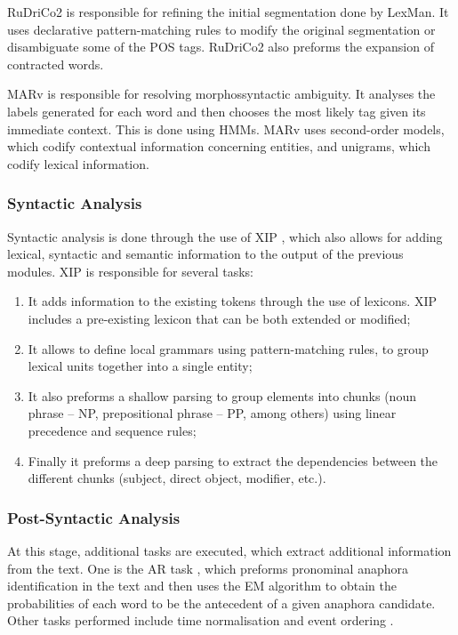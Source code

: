 \ac{RuDriCo2} is responsible for refining the initial segmentation done by
LexMan. It uses declarative pattern-matching rules to modify the original
segmentation or disambiguate some of the \ac{POS} tags. \ac{RuDriCo2} also
preforms the expansion of contracted words.

\ac{MARv} is responsible for resolving morphossyntactic ambiguity. It analyses
the labels generated for each word and then chooses the most likely tag given
its immediate context. This is done using \acp{HMM}. \ac{MARv} uses
second-order models, which codify contextual information concerning entities,
and unigrams, which codify lexical information.

\subsubsection*{Syntactic Analysis}

Syntactic analysis is done through the use of \acf{XIP} 
\citep{ait2002robustness},
which also allows for adding lexical, syntactic and semantic information to the
output of the previous modules. \ac{XIP} is responsible for several tasks:

\begin{enumerate}[label=(\roman*)]
 \item It adds information to the existing tokens through the use of lexicons.
\ac{XIP} includes a pre-existing lexicon that can be both extended or modified;
 \item It allows to define local grammars using pattern-matching rules, to group
lexical units together into a single entity;
 \item It also preforms a shallow parsing to group elements into chunks (noun
 phrase -- NP, prepositional phrase -- PP, among others) using linear precedence
 and sequence rules;
 \item Finally it preforms a deep parsing to extract the dependencies between the
different chunks (subject, direct object, modifier, etc.).
\end{enumerate}

\subsubsection*{Post-Syntactic Analysis}

At this stage, additional tasks are executed, which extract additional 
information from the text. One is the \ac{AR} task \citep{marques2013anaphora}, 
which preforms pronominal anaphora identification in the text and then uses the 
\ac{EM} algorithm to obtain the probabilities of each word to be the antecedent 
of a given anaphora candidate. Other tasks performed include time normalisation 
\citep{mauricio2011normalizacao} and event ordering
\citep{cabrita2014ordenar}.

